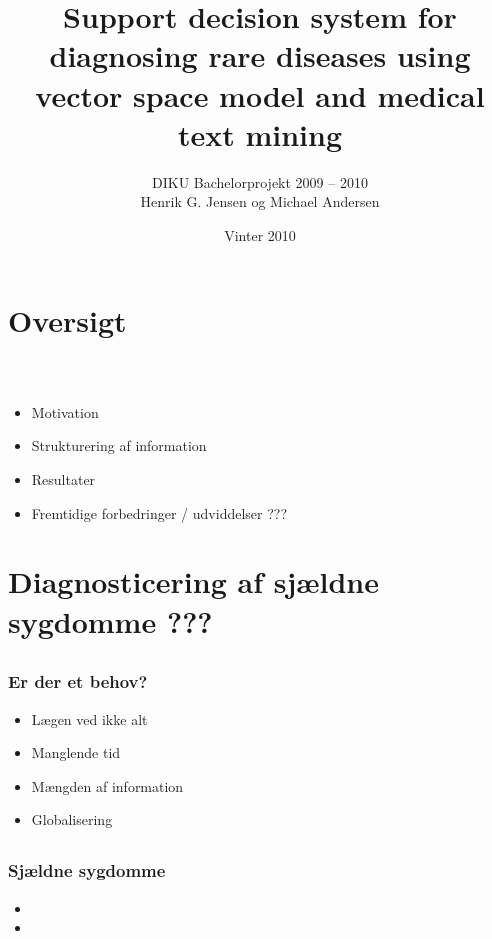 \documentclass[xcolor=table]{beamer}
\title{ \textbf{Support decision system for diagnosing rare diseases using vector space model and medical text mining}}
\subtitle{{\footnotesize DIKU Bachelorprojekt 2009 -- 2010}\\{\tiny Henrik G. Jensen og Michael Andersen}}
\date{Vinter 2010}
\begin{document}
\begin{frame}
    \titlepage
\end{frame}

\section{Oversigt}
\begin{frame}

    \frametitle{\ }

      \begin{itemize}
	  \item Motivation
	  \item Strukturering af information
	  \item Resultater
	  \item Fremtidige forbedringer /  udviddelser ??? 
      \end{itemize}

\end{frame}

\section{Diagnosticering af sjældne sygdomme ???}

\subsection*{}

\begin{frame}

  \frametitle{Er der et behov?}

  \begin{itemize}
    \item <1> Lægen ved ikke alt
    \item <1> Manglende tid
    \item <1> Mængden af information
    \item <1> Globalisering
  \end{itemize}

\end{frame}


\subsection*{}
\begin{frame}

  \frametitle{Sjældne sygdomme}

  \begin{itemize}
    \item 
    \item
  \end{itemize}
  

\end{frame}
\end{document}
